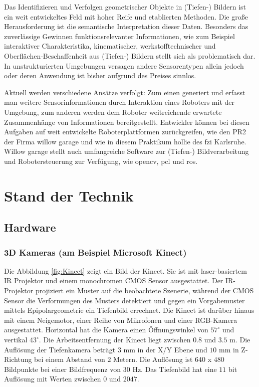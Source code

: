 Das Identifizieren und Verfolgen geometrischer Objekte in (Tiefen-) Bildern ist ein weit entwickeltes Feld mit hoher Reife und etablierten Methoden.
 Die große Herausforderung ist die semantische Interpretation dieser Daten. Besonders das zuverlässige Gewinnen funktionsrelevanter Informationen,
 wie zum Beispiel interaktiver Charakteristika, kinematischer, werkstofftechnischer und  Oberflächen-Beschaffenheit aus (Tiefen-) Bildern stellt sich
 als problematisch dar. In unstrukturierten Umgebungen versagen andere Sensorentypen allein jedoch oder deren Anwendung ist bisher aufgrund des Preises sinnlos.
 
Aktuell werden verschiedene Ansätze verfolgt: Zum einen generiert und erfasst man weitere Sensorinformationen durch Interaktion eines Roboters mit der Umgebung,
 zum anderen werden dem Roboter weitreichende erwartete Zusammenhänge von Informationen bereitgestellt. Entwickler können bei diesen Aufgaben auf weit entwickelte Roboterplattformen
 zurückgreifen, wie den PR2 der Firma willow garage und wie in diesem Praktikum
 \gls{hollie} des \gls{fzi} Karlsruhe. Willow garage stellt auch umfangreiche
 Software zur (Tiefen-) Bildverarbeitung und Robotersteuerung zur Verfügung,
 wie \gls{opencv}, \gls{pcl} und \gls{ros}.

\section{Stand der Technik}
\label{stand_der_technik_sec}
\authorsection{\editordummy}

\subsection{Hardware}
\subsubsection{3D Kameras (am Beispiel Microsoft Kinect)}
Die Abbildung \ref{fig:Kinect} zeigt ein Bild der Kinect. Sie ist mit
 laser-basiertem IR Projektor und einem monochromen CMOS Sensor ausgestattet.
 Der IR-Projektor projiziert ein Muster auf die beobachtete Szenerie,
 während der CMOS Sensor die Verformungen des Musters detektiert und gegen
 ein Vorgabemuster mittels Epipolargeometrie ein Tiefenbild errechnet.
 Die Kinect ist darüber hinaus mit einem Neigemotor, einer Reihe von Mikrofonen
 und einer RGB-Kamera ausgestattet. Horizontal hat die Kamera einen Öffnungswinkel
 von $57^\circ$ und vertikal $43^\circ$. Die Arbeitsentfernung der Kinect liegt
 zwischen $0.8$ und $3.5$ m. Die Auflösung der Tiefenkamera beträgt $3$ mm in
 der X/Y Ebene und $10$ mm in Z-Richtung bei einem Abstand von $2$ Metern. Die
 Auflösung ist $640$ x $480$ Bildpunkte bei einer Bildfrequenz von $30$ Hz. Das
 Tiefenbild hat eine $11$ bit Auflösung mit Werten zwischen $0$ und $2047$.


